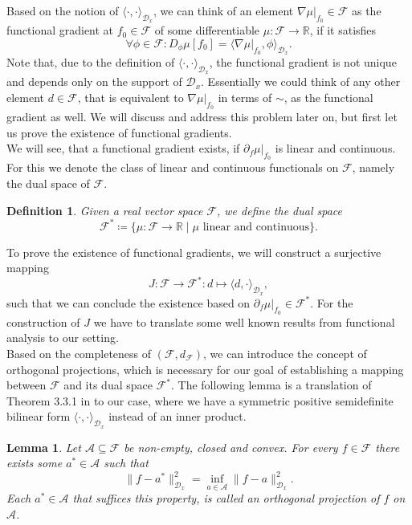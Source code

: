 \documentclass[11pt, a4paper]{article}
\newtheorem{lemma}[theorem]{Lemma}
\newtheorem{definition}[theorem]{Definition}
\newcommand{\R}{\mathbb{R}}
\newcommand{\A}{\mathcal{A}}
\newcommand{\D}{\mathcal{D}}
\newcommand{\F}{\mathcal{F}}
\begin{document}
Based on the notion of $\langle \cdot, \cdot \rangle_{\D_x}$, we can think of an element $\nabla \mu |_{f_0} \in \F$ as the functional gradient at $f_0 \in \F$ of some differentiable $\mu : \F \to \R$, if it satisfies
\[ \forall \phi \in \F : D_\phi\mu[f_0] = \big \langle \nabla \mu |_{f_0}, \phi \big \rangle_{\D_x}. \]
Note that, due to the definition of $\langle \cdot, \cdot \rangle_{\D_x}$, the functional gradient is not unique and depends only on the support of $\D_x$. Essentially we could think of any other element $d \in \F$, that is equivalent to $\nabla \mu |_{f_0}$ in terms of $\sim$, as the functional gradient as well. We will discuss and address this problem later on, but first let us prove the existence of functional gradients. \\

We will see, that a functional gradient exists, if $\partial_f \mu |_{f_0}$ is linear and continuous. For this we denote the class of linear and continuous functionals on $\F$, namely the dual space of $\F$.

\begin{definition}
Given a real vector space $\F$, we define the dual space
\[ \F^* \coloneq \Big \{ \mu : \F \to \R \mid \mu \text{ linear and continuous} \Big \}. \]
\end{definition}

To prove the existence of functional gradients, we will construct a surjective mapping 
\[ J: \F \to \F^* : d \mapsto \langle d, \cdot \rangle_{\D_x}, \]
such that we can conclude the existence based on $\partial_f \mu |_{f_0} \in \F^*$. For the construction of $J$ we have to translate some well known results from functional analysis to our setting. \\

Based on the completeness of $(\F, d_\F)$, we can introduce the concept of orthogonal projections, which is necessary for our goal of establishing a mapping between $\F$ and its dual space $\F^*$. The following lemma is a translation of Theorem 3.3.1 in \cite{FunctionalAnalysis} to our case, where we have a symmetric positive semidefinite bilinear form $\langle \cdot, \cdot \rangle_{\D_x}$ instead of an inner product.

\begin{lemma} \label{lem:projection}
Let $\A \subseteq \F$ be non-empty, closed and convex. For every $f \in \F$ there exists some $a^* \in \A$ such that 
\[ \big \| f - a^* \big \|_{\D_x}^2 = \inf_{a \in \A} \big \| f - a \big \|_{\D_x}^2. \]
Each $a^* \in \A$ that suffices this property, is called an orthogonal projection of $f$ on $\A$.
\end{lemma}
\end{document}
